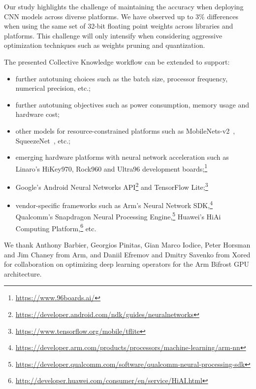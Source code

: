 \documentclass[sigplan]{acmart}
\begin{document}
Our study highlights the challenge of maintaining the accuracy when deploying
CNN models across diverse platforms.
%
We have observed up to $3\%$ differences when using the same set of 32-bit
floating point weights across libraries and platforms.
%
This challenge will only intensify when considering aggressive optimization
techniques such as weights pruning and quantization.

The presented Collective Knowledge workflow can be extended to support:
\begin{itemize}

  \item further autotuning choices such as the batch size, processor frequency, numerical precision, etc.;

  \item further autotuning objectives such as power consumption, memory usage and hardware cost;

  \item other models for resource-constrained platforms such as MobileNets-v2~\cite{Sandler:MobileNets-v2}, SqueezeNet~\cite{Iandola:SqueezeNet}, etc.;

  \item emerging hardware platforms with neural network acceleration such as Linaro's HiKey970, Rock960 and Ultra96 development boards;\footnote{\url{https://www.96boards.ai/}}

  \item Google's Android Neural Networks API\footnote{\url{https://developer.android.com/ndk/guides/neuralnetworks}} and TensorFlow Lite;\footnote{\url{https://www.tensorflow.org/mobile/tflite}}

  \item vendor-specific frameworks such as Arm's Neural Network SDK,\footnote{\url{https://developer.arm.com/products/processors/machine-learning/arm-nn}} Qualcomm's Snapdragon Neural Processing Engine,\footnote{\url{https://developer.qualcomm.com/software/qualcomm-neural-processing-sdk}} Huawei's HiAi Computing Platform,\footnote{\url{http://developer.huawei.com/consumer/en/service/HiAI.html}} etc.

\end{itemize}



\begin{acks} 

We thank Anthony Barbier, Georgios Pinitas, Gian Marco Iodice, Peter Horsman
and Jim Chaney from Arm, and Daniil Efremov and Dmitry Savenko from Xored for
collaboration on optimizing deep learning operators for the Arm Bifrost GPU
architecture.

\end{acks}
\end{document}
